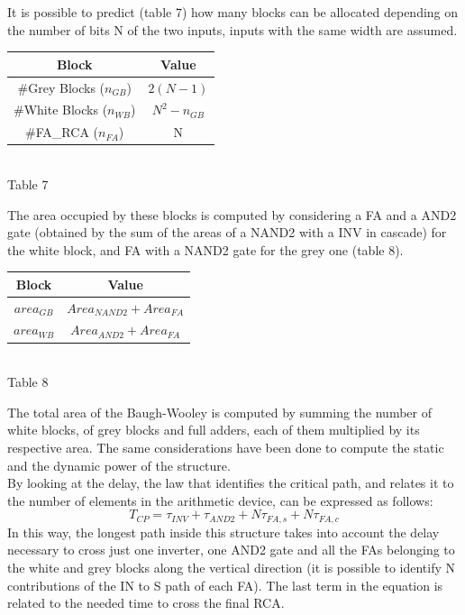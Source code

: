 \documentclass[11pt]{article} %
\begin{document}
\vspace{1em}
It is possible to predict (table 7) how many blocks can be allocated depending on the number of bits N of the two inputs, inputs with the same width are assumed.
\begin{center}
\begin{tabular}{|c|c|}
	\hline 
            Block  & Value \\
	\hline          
	 \#Grey Blocks ($n_{GB}$) & $2 (N-1)$  \\
	\hline 
	\#White Blocks ($n_{WB}$)  &  $N^{2} - n_{GB}$ \\
	\hline 
	\#FA_{RCA} ($n_{FA}$)   & N \\
	\hline 
\end{tabular} \\
\small{Table 7}
\end{center}
The area occupied by these blocks is computed by considering a FA and a AND2 gate (obtained by the sum of the areas of a NAND2 with a INV in cascade) for the white block, and FA with a NAND2 gate for the grey one (table 8).
\begin{center}
\begin{tabular}{|c|c|}
	\hline 
            Block  & Value  \\
	\hline          
	 $area_{GB}$ & $Area_{NAND2} + Area_{FA} $ \\
	\hline 
	$area_{WB}$ & $Area_{AND2} + Area_{FA} $  \\
	\hline 
\end{tabular} \\
\small{Table 8}
\end{center}
The total area of the Baugh-Wooley is computed by summing the number of white blocks, of grey blocks and full adders, each of them multiplied by its respective area. The same considerations have been done to compute the static and the dynamic power of the structure.\\
By looking at the delay, the law that identifies the critical path, and relates it to the number of elements in the arithmetic device, can be expressed as follows:
$$ T_{CP} = \tau_{INV} + \tau_{AND2} + N \tau_{FA,s} + N \tau_{FA,c} $$
In this way, the longest path inside this structure takes into account the delay necessary to cross just one inverter, one AND2 gate and all the FAs belonging to the white and grey blocks along the vertical direction (it is possible to identify N contributions of the IN to S path of each FA). The last term in the equation is related to the needed time to cross the final RCA.
\vspace{2em}
\end{document}
